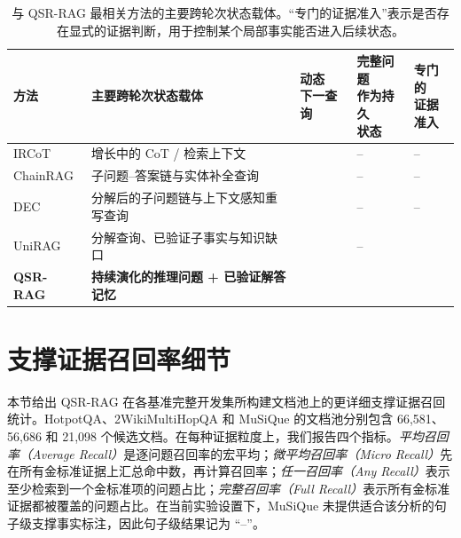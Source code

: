 \documentclass[11pt]{article}
\begin{document}
	\begin{table}[t]
		\centering
		\caption{与 QSR-RAG 最相关方法的主要跨轮次状态载体。``专门的证据准入''表示是否存在显式的证据判断，用于控制某个局部事实能否进入后续状态。}
		\label{tab:related-positioning}
		\small
		\setlength{\tabcolsep}{3.5pt}
		\begin{tabularx}{\textwidth}{@{}p{}X>{\centering\arraybackslash}p{}>{\centering\arraybackslash}p{}>{\centering\arraybackslash}p{}@{}}
			\toprule
			方法 & 主要跨轮次状态载体 & \makecell{动态\\下一查询} & \makecell{完整问题\\作为持久\\状态} & \makecell{专门的\\证据\\准入} \\
			\midrule
			IRCoT & 增长中的 CoT / 检索上下文 & \checkmark & -- & -- \\
			ChainRAG & 子问题--答案链与实体补全查询 & \checkmark & -- & -- \\
			DEC & 分解后的子问题链与上下文感知重写查询 & \checkmark & -- & -- \\
			UniRAG & 分解查询、已验证子事实与知识缺口 & \checkmark & -- & \checkmark \\
			\textbf{QSR-RAG} & \textbf{持续演化的推理问题 + 已验证解答记忆} & \checkmark & \checkmark & \checkmark \\
			\bottomrule
		\end{tabularx}
	\end{table}

	\section{支撑证据召回率细节}
	\label{app:evidence-recall}

	本节给出 QSR-RAG 在各基准完整开发集所构建文档池上的更详细支撑证据召回统计。HotpotQA、2WikiMultiHopQA 和 MuSiQue 的文档池分别包含 66,581、56,686 和 21,098 个候选文档。在每种证据粒度上，我们报告四个指标。\textit{平均召回率（Average Recall）}是逐问题召回率的宏平均；\textit{微平均召回率（Micro Recall）}先在所有金标准证据上汇总命中数，再计算召回率；\textit{任一召回率（Any Recall）}表示至少检索到一个金标准项的问题占比；\textit{完整召回率（Full Recall）}表示所有金标准证据都被覆盖的问题占比。在当前实验设置下，MuSiQue 未提供适合该分析的句子级支撑事实标注，因此句子级结果记为 ``--''。
\end{document}

